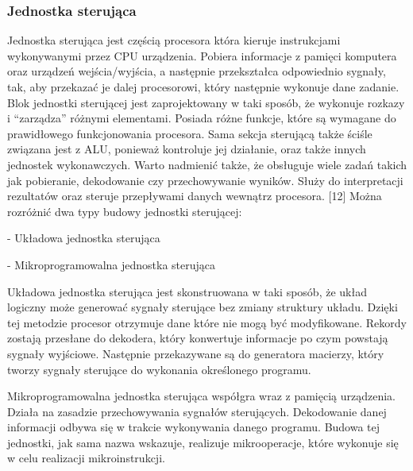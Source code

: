 \documentclass[12pt, a4paper, onside, polish]{article}				%
\begin{document}
\subsubsection{Jednostka sterująca}
\hspace{\parindent}
Jednostka sterująca jest częścią procesora która kieruje instrukcjami wykonywanymi przez CPU urządzenia. Pobiera informacje z pamięci komputera oraz urządzeń wejścia/wyjścia, a następnie przekształca odpowiednio sygnały, tak, aby przekazać je dalej procesorowi, który następnie wykonuje dane zadanie. Blok jednostki sterującej jest zaprojektowany w taki sposób, że wykonuje rozkazy i “zarządza” różnymi elementami. Posiada różne funkcje, które są wymagane do prawidłowego funkcjonowania procesora. Sama sekcja sterującą także ściśle związana jest z ALU, ponieważ kontroluje jej działanie, oraz także innych jednostek wykonawczych. Warto nadmienić także, że obsługuje wiele zadań takich jak pobieranie, dekodowanie czy przechowywanie wyników. Służy do interpretacji rezultatów oraz steruje przepływami danych wewnątrz procesora. [12]
\newline\newline
	Można rozróżnić dwa typy budowy jednostki sterującej: 
 
- Układowa jednostka sterująca 

- Mikroprogramowalna jednostka sterująca\newline

 

Układowa jednostka sterująca jest skonstruowana w taki sposób, że układ logiczny może generować sygnały sterujące bez zmiany struktury układu. Dzięki tej metodzie procesor otrzymuje dane które nie mogą być modyfikowane. Rekordy zostają przesłane do dekodera, który konwertuje informacje po czym powstają sygnały wyjściowe. Następnie przekazywane są do generatora macierzy, który tworzy sygnały sterujące do wykonania określonego programu. \newline

 

Mikroprogramowalna jednostka sterująca współgra wraz z pamięcią urządzenia. Działa na zasadzie przechowywania sygnałów sterujących. Dekodowanie danej informacji odbywa się w trakcie wykonywania danego programu. Budowa tej jednostki, jak sama nazwa wskazuje, realizuje mikrooperacje, które wykonuje się w celu realizacji mikroinstrukcji.  
\end{document}
